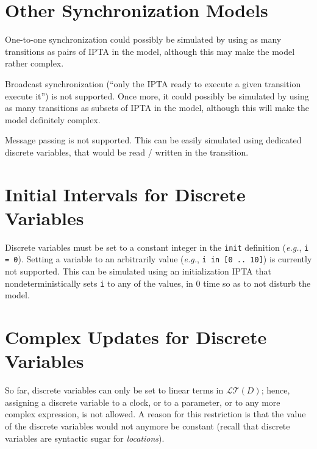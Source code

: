 \documentclass[a4paper,11pt]{report}
\makeatletter
\newcommand{\DVar}{D} %
\newcommand{\LTerm}{\mathcal{LT}} %
\newcommand{\LTermD}{\LTerm(\DVar)}
\newcommand{\IPTA}{IPTA}
\newcommand{\styleIMI}[1]{\textcolor{imicolor}{\texttt{#1}}}
\newcommand{\eg}{\textcolor{colorok}{\textit{e.g.},\@}}
\makeatother
\begin{document}
\section{Other Synchronization Models}

One-to-one synchronization could possibly be simulated by using as many transitions as pairs of \IPTA{} in the model, although this may make the model rather complex.



Broadcast synchronization (``only the \IPTA{} ready to execute a given transition execute it'') is not supported.
Once more, it could possibly be simulated by using as many transitions as subsets of \IPTA{} in the model, although this will make the model definitely complex.



Message passing is not supported.
This can be easily simulated using dedicated discrete variables, that would be read / written in the transition.



\section{Initial Intervals for Discrete Variables}

Discrete variables must be set to a constant integer in the \styleIMI{init} definition (\eg{} \styleIMI{i = 0}).
Setting a variable to an arbitrarily value (\eg{} \styleIMI{i in [0 .. 10]}) is currently not supported.
This can be simulated using an initialization \IPTA{} that nondeterministically sets \styleIMI{i} to any of the values, in 0 time so as to not disturb the model.


\section{Complex Updates for Discrete Variables}

So far, discrete variables can only be set to linear terms in $\LTermD$;
hence, assigning a discrete variable to a clock, or to a parameter, or to any more complex expression, is not allowed.
A reason for this restriction is that the value of the discrete variables would not anymore be constant (recall that discrete variables are syntactic sugar for \emph{locations}).
\end{document}
